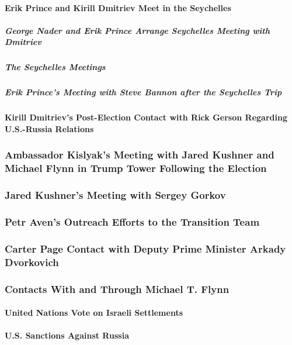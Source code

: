 \paragraph{Erik Prince and Kirill Dmitriev Meet in the Seychelles}

\subparagraph{George Nader and Erik Prince Arrange Seychelles Meeting with Dmitriev}

\subparagraph{The Seychelles Meetings}

\subparagraph{Erik Prince's Meeting with Steve Bannon after the Seychelles Trip}

\paragraph{Kirill Dmitriev's Post-Election Contact with Rick Gerson Regarding U.S.-Russia Relations}

\subsubsection{Ambassador Kislyak's Meeting with Jared Kushner and Michael Flynn in Trump Tower Following the Election}

\subsubsection{Jared Kushner's Meeting with Sergey Gorkov}

\subsubsection{Petr Aven's Outreach Efforts to the Transition Team}

\subsubsection{Carter Page Contact with Deputy Prime Minister Arkady Dvorkovich}

\subsubsection{Contacts With and Through Michael T. Flynn}

\paragraph{United Nations Vote on Israeli Settlements}

\paragraph{U.S. Sanctions Against Russia}
